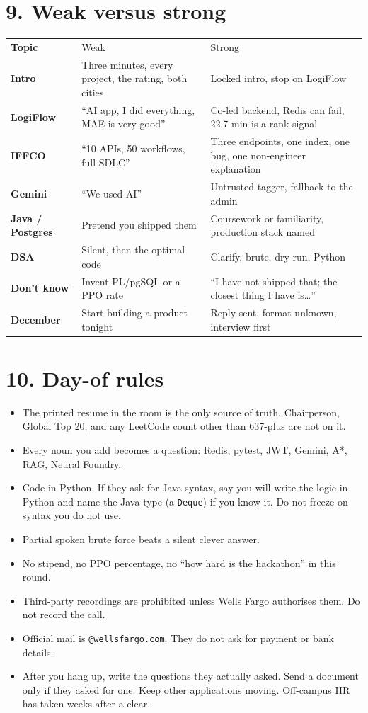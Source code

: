 \documentclass[a4paper,9.5pt]{extarticle}
\begin{document}
\section{9. Weak versus strong}
\noindent\begin{tabularx}{\textwidth}{@{}>{\bfseries}p{3.1cm} >{\color{muted}}X >{\color{ok}}X@{}}
Topic & Weak & Strong \\
Intro & Three minutes, every project, the rating, both cities & Locked intro, stop on LogiFlow \\
LogiFlow & ``AI app, I did everything, MAE is very good'' & Co-led backend, Redis can fail, 22.7 min is a rank signal \\
IFFCO & ``10 APIs, 50 workflows, full SDLC'' & Three endpoints, one index, one bug, one non-engineer explanation \\
Gemini & ``We used AI'' & Untrusted tagger, fallback to the admin \\
Java / Postgres & Pretend you shipped them & Coursework or familiarity, production stack named \\
DSA & Silent, then the optimal code & Clarify, brute, dry-run, Python \\
Don't know & Invent PL/pgSQL or a PPO rate & ``I have not shipped that; the closest thing I have is\ldots'' \\
December & Start building a product tonight & Reply sent, format unknown, interview first \\
\end{tabularx}

\section{10. Day-of rules}
\begin{itemize}
  \item The printed resume in the room is the only source of truth. Chairperson, Global Top 20, and any LeetCode count other than 637-plus are not on it.
  \item Every noun you add becomes a question: Redis, pytest, JWT, Gemini, A*, RAG, Neural Foundry.
  \item Code in Python. If they ask for Java syntax, say you will write the logic in Python and name the Java type (a \texttt{Deque}) if you know it. Do not freeze on syntax you do not use.
  \item Partial spoken brute force beats a silent clever answer.
  \item No stipend, no PPO percentage, no ``how hard is the hackathon'' in this round.
  \item Third-party recordings are prohibited unless Wells Fargo authorises them. Do not record the call.
  \item Official mail is \texttt{@wellsfargo.com}. They do not ask for payment or bank details.
  \item After you hang up, write the questions they actually asked. Send a document only if they asked for one. Keep other applications moving. Off-campus HR has taken weeks after a clear.
\end{itemize}
\end{document}
